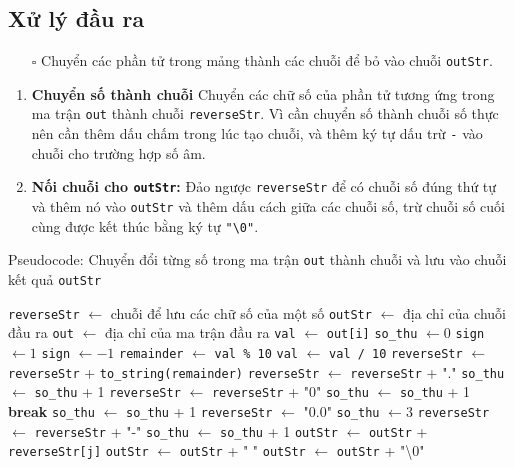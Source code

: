 \documentclass{article}
\begin{document}
\subsection{Xử lý đầu ra}
\begin{itemize}
	\item [$\square$] Chuyển các phần tử trong mảng thành các chuỗi để bỏ vào chuỗi \texttt{outStr}.
\end{itemize}
\begin{enumerate}
	\item \textbf{Chuyển số thành chuỗi} Chuyển các chữ số của phần tử tương ứng trong ma trận \texttt{out} thành chuỗi \texttt{reverseStr}. Vì cần chuyển số thành chuỗi số thực nên cần thêm dấu chấm trong lúc tạo chuỗi, và thêm ký tự dấu trừ \texttt{-} vào chuỗi cho trường hợp số âm.
	\item \textbf{Nối chuỗi cho \texttt{outStr}:} Đảo ngược \texttt{reverseStr} để có chuỗi số đúng thứ tự và thêm nó vào \texttt{outStr} và thêm dấu cách giữa các chuỗi số, trừ chuỗi số cuối cùng được kết thúc bằng ký tự \texttt{"\textbackslash 0"}.
\end{enumerate}
\begin{algorithm}
	\caption{Pseudocode: Chuyển đổi từng số trong ma trận \texttt{out} thành chuỗi và lưu vào chuỗi kết quả \texttt{outStr}}
	\begin{algorithmic}[1]
		\State \texttt{reverseStr} $\gets$ chuỗi để lưu các chữ số của một số
		\State \texttt{outStr} $\gets$ địa chỉ của chuỗi đầu ra
		\State \texttt{out} $\gets$ địa chỉ của ma trận đầu ra
		\State \texttt{val} $\gets$ \texttt{out[i]}
		\State \texttt{so\_thu} $\gets 0$
		 
		\State \texttt{sign} $\gets 1$
		\State \texttt{sign} $\gets -1$
		\EndIf
		 
		\State \texttt{remainder} $\gets$ \texttt{val \% 10}
		\State \texttt{val} $\gets$ \texttt{val / 10}
		\State \texttt{reverseStr} $\gets$ \texttt{reverseStr} + \texttt{to\_string(remainder)}
		\State \texttt{reverseStr} $\gets$ \texttt{reverseStr} + "."
		\State \texttt{so\_thu} $\gets$ \texttt{so\_thu} + 1
		\State \texttt{reverseStr} $\gets$ \texttt{reverseStr} + "0"
		\State \texttt{so\_thu} $\gets$ \texttt{so\_thu} + 1
		\State \textbf{break}
		\EndIf
		\EndIf
		\State \texttt{so\_thu} $\gets$ \texttt{so\_thu} + 1
		\EndWhile
		\Else {}
		\State \texttt{reverseStr} $\gets$ "0.0"
		\State \texttt{so\_thu} $\gets 3$
		\EndIf
		 
		\State \texttt{reverseStr} $\gets$ \texttt{reverseStr} + "-"
		\State \texttt{so\_thu} $\gets$ \texttt{so\_thu} + 1
		\EndIf
		\State \texttt{outStr} $\gets$ \texttt{outStr} + \texttt{reverseStr[j]}
		\EndFor
		\State \texttt{outStr} $\gets$ \texttt{outStr} + " "
		\Else
		\State \texttt{outStr} $\gets$ \texttt{outStr} + "\textbackslash0"
		\EndIf
		\EndFor
	\end{algorithmic}
\end{algorithm}
\end{document}
